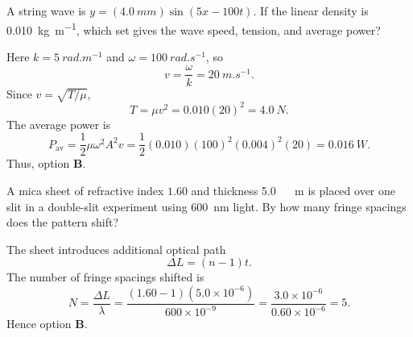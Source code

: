 \begin{quizquestion}[
  id=phy104-wave-031,
  topic=waves-and-sound,
  difficulty=applied,
  marks=2,
  correct=B,
  tags={travelling-wave,string,tension,power},
  outcome={Relate a wave equation to speed tension and average power}
]
  A string wave is \(y=(\SI{4.0}{mm})\sin(5x-100t)\). If the linear density is \SI{0.010}{kg.m^{-1}}, which set gives the wave speed, tension, and average power?
\end{quizquestion}
\begin{quizsolution}
  Here \(k=\SI{5}{rad.m^{-1}}\) and \(\omega=\SI{100}{rad.s^{-1}}\), so
  \[
    v=\frac{\omega}{k}=\SI{20}{m.s^{-1}}.
  \]
  Since \(v=\sqrt{T/\mu}\),
  \[
    T=\mu v^2=0.010{(20)}^2=\SI{4.0}{N}.
  \]
  The average power is
  \[
    P_{\mathrm{av}}=\frac12\mu\omega^2A^2v
    =\frac12{(0.010)}{(100)}^2{(0.004)}^2{(20)}
    =\SI{0.016}{W}.
  \]
  Thus, option \textbf{B}.
\end{quizsolution}

\begin{quizquestion}[
  id=phy104-opt-036,
  topic=optics,
  difficulty=applied,
  marks=2,
  correct=B,
  tags={double-slit,optical-path,fringe-shift},
  outcome={Calculate the fringe shift caused by a transparent sheet}
]
  A mica sheet of refractive index \(1.60\) and thickness \SI{5.0}{\micro\,m} is placed over one slit in a double-slit experiment using \SI{600}{nm} light. By how many fringe spacings does the pattern shift?
\end{quizquestion}
\begin{quizsolution}
  The sheet introduces additional optical path
  \[
    \Delta L=(n-1)t.
  \]
  The number of fringe spacings shifted is
  \[
    N=\frac{\Delta L}{\lambda}
    =\frac{(1.60-1)(5.0\times10^{-6})}{600\times10^{-9}}
    =\frac{3.0\times10^{-6}}{0.60\times10^{-6}}=5.
  \]
  Hence option \textbf{B}.
\end{quizsolution}

